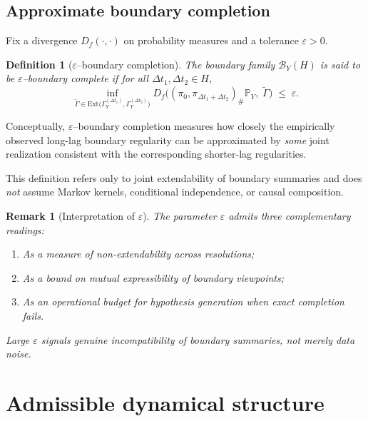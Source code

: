 \documentclass[11pt]{article}
\newtheorem{definition}{Definition}
\newtheorem{remark}{Remark}
\newcommand{\Ext}{\mathrm{Ext}} 	%
\begin{document}
\subsection{Approximate boundary completion}

Fix a divergence $D_f(\cdot,\cdot)$ on probability measures and a tolerance $\varepsilon>0$.

\begin{definition}[$\varepsilon$--boundary completion]\label{def:eps-boundary-completion}
The boundary family $\mathcal B_Y(H)$ is said to be \emph{$\varepsilon$--boundary complete} if for all
$\Delta t_1,\Delta t_2\in H$,
\[
\inf_{\widetilde\Gamma\in
\Ext\bigl(\Gamma_Y^{(\Delta t_1)},\Gamma_Y^{(\Delta t_2)}\bigr)}
D_f\!\Big(
(\pi_0,\pi_{\Delta t_1+\Delta t_2})_\# \mathbb P_Y,\;
\widetilde\Gamma
\Big)
\;\le\;
\varepsilon.
\]
\end{definition}

Conceptually, $\varepsilon$--boundary completion measures how closely the empirically observed
long-lag boundary regularity can be approximated by \emph{some} joint realization consistent with
the corresponding shorter-lag regularities.

This definition refers only to joint extendability of boundary summaries and does \emph{not}
assume Markov kernels, conditional independence, or causal composition.

\begin{remark}[Interpretation of $\varepsilon$]\label{rem:epsilon-meaning}
The parameter $\varepsilon$ admits three complementary readings:
\begin{enumerate}
  \item As a measure of \emph{non-extendability} across resolutions;
  \item As a bound on \emph{mutual expressibility} of boundary viewpoints;
  \item As an \emph{operational budget} for hypothesis generation when exact completion fails.
\end{enumerate}
Large $\varepsilon$ signals genuine incompatibility of boundary summaries, not merely data noise.
\end{remark}


\section{Admissible dynamical structure}
\end{document}
